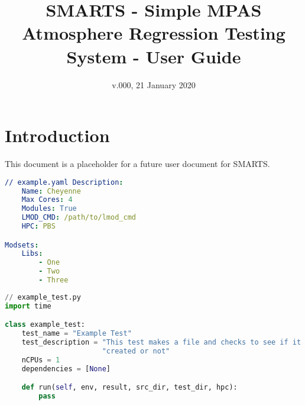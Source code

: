 \documentclass[11pt]{report}
\begin{document}
\title{SMARTS - Simple MPAS Atmosphere Regression Testing System - User Guide}
\date{v.000, 21 January 2020}

\maketitle
\tableofcontents

\chapter{Introduction}
\label{chap:intro}

This document is a placeholder for a future user document for SMARTS.

\begin{lstlisting}[language=yaml,
                   caption={YAML Example Code Listing},
                   label=yaml_exmaple]
// example.yaml Description:
    Name: Cheyenne
    Max Cores: 4
    Modules: True
    LMOD_CMD: /path/to/lmod_cmd
    HPC: PBS

Modsets:
    Libs:
        - One
        - Two
        - Three
\end{lstlisting}

\begin{lstlisting}[language=Python,
                   caption={Example Python Listing},
                   label=python_example]
// example_test.py
import time

class example_test:
    test_name = "Example Test"
    test_description = "This test makes a file and checks to see if it was" \
                       "created or not"
    nCPUs = 1
    dependencies = [None]

    def run(self, env, result, src_dir, test_dir, hpc):
        pass
\end{lstlisting}









\appendix




\end{document}
